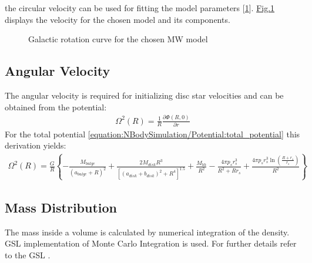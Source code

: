 \documentclass[letterpaper,10pt,english]{sphinxmanual}
\begin{document}
				\sphinxAtStartPar
				the circular velocity can be used for fitting the model parameters {[}\hyperlink{cite.NBodySimulation/Appendix:id60}{1}{]}.
				\hyperref[\detokenize{NBodySimulation/Potential:fig-potential-circular-velocity}]{Fig.\@ \ref{\detokenize{NBodySimulation/Potential:fig-potential-circular-velocity}}} displays the velocity for the chosen model and its components.
				
				\begin{figure}[htbp]
				\centering
				\capstart
				
				\noindent{}
				\caption{Galactic rotation curve for the chosen MW model}\label{\detokenize{NBodySimulation/Potential:id9}}\label{\detokenize{NBodySimulation/Potential:fig-potential-circular-velocity}}\end{figure}
			
			
			\subsection{Angular Velocity}
				\label{\detokenize{NBodySimulation/Potential:angular-velocity}}
				\sphinxAtStartPar
				The angular velocity is required for initializing disc star velocities and can be obtained from the potential:
				\begin{equation*}
				\begin{split}\Omega ^{2}\left ( R \right ) = \frac{1}{R}\frac{\partial \Phi \left ( R,0 \right )}{\partial r}\end{split}
				\end{equation*}
				\sphinxAtStartPar
				For the total potential \eqref{equation:NBodySimulation/Potential:total_potential} this derivation yields:
				\begin{equation*}
				\begin{split}\Omega ^{2}\left ( R \right ) = \frac{G}{R} \left\{-\frac{M_{bulge}}{(a_{bulge}+R)^2}+\frac{2 M_{disk} R^3}{\left[\left(a_{disk}+b_{disk}\right)^2+R^4\right]^{1.5}}+\frac{M_{bh}}{R^2}-\frac{4 \pi  p_{s} r_{s}^3}{R^2+R r_{s}}+\frac{4 \pi  p_{s} r_{s}^3 \ln \left(\frac{R+r_{s}}{r_{s}}\right)}{R^2}\right\}\end{split}
				\end{equation*}
			
			\subsection{Mass Distribution}
				\label{\detokenize{NBodySimulation/Potential:mass-distribution}}
				\sphinxAtStartPar
				The mass inside a volume is calculated by numerical integration of the density.
				GSL implementation of Monte Carlo Integration is used. For further details refer to the GSL .
				
\end{document}
